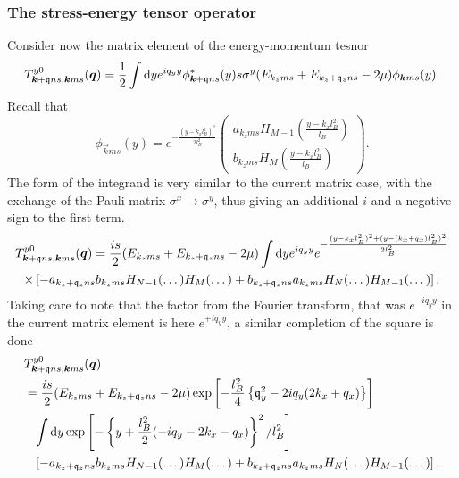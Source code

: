 \subsubsection{The stress-energy tensor operator}
Consider now the matrix element of the energy-momentum tesnor
\begin{equation}
\label{eq:75}
T^{y 0}_{\bm{k}+\mathfrak{q}ns, \bm{k}ms} (\bm{q})
=
\frac{1}{2}
\int \mathrm{d}y e^{iq_y y}
\phi ^* _{\bm{k}+\mathfrak{q} ns}(y) s \sigma ^y (E_{k_z m s} + E_{k_z+\mathfrak{q}_z n s}- 2\mu )
\phi _{\bm{k} ms}(y).
\end{equation}
Recall that 
\begin{equation}
  \phi _{\vec{k}ms}(y) =
  e^{- \frac{(y - k_x l_B ^2)^2}{2 l_B^2}}
  \begin{pmatrix}
    a_{k_z ms} H_{M-1} \left( \frac{y-k_x l_B^2}{l_B} \right)\\
    b_{k_z ms} H_M \left( \frac{y - k_x l_B^2}{l_B} \right)
  \end{pmatrix}.
\end{equation}
The form of the integrand is very similar to the current matrix case, with the exchange of the Pauli matrix $\sigma ^x \to \sigma ^y$, thus giving an additional $i$ and a negative sign to the first term.
\begin{multline}
T^{y 0}_{\bm{k}+\mathfrak{q}ns, \bm{k}ms} (\bm{q})
  = \frac{i s}{2}
    (E_{k_z m s} + E_{k_z+\mathfrak{q}_z n s}- 2\mu )
    \int \mathrm{d}y e^{iq_y y} e^{- \frac{(y-k_xl_B^2)^2 + (y-(k_x + q_x) l_B^2)^2}{2 l_B^2}}\\
    \times \left[
    - a_{k_z+\mathfrak{q}_z ns} b_{k_z ms} H_{N-1} (\dots ) H_M(\dots )
    + b_{k_z+\mathfrak{q}_z ns} a_{k_zms} H_N(\dots ) H_{M-1}(\dots )
    \right].
\end{multline}
Taking care to note that the factor from the Fourier transform, that was $e^{-iq_y y}$ in the current matrix element is here $e^{+ i q_y y}$, a similar completion of the square is done
\begin{equation}
  \begin{split}
    &T^{y 0}_{\bm{k}+\mathfrak{q}ns, \bm{k}ms} (\bm{q})\\
    &=
    \frac{i s}{2}
    (E_{k_z m s} + E_{k_z+\mathfrak{q}_z n s}- 2\mu )
    \exp \left[
      -\frac{l_B^2}{4} \left\{ \mathfrak{q}_y^2 - 2 i q_y (2 k_x + q_x) \right\}
    \right]\\
    &\phantom{=} \int \mathrm{d}y
    \exp \left[
      -\left\{ y + \frac{l_B^2}{2} (-iq_y - 2 k_x - q_x) \right\}^2 / l_B^2
    \right]\\
    &\phantom{=} \left[
      - a_{k_z+\mathfrak{q}_z ns} b_{k_z ms} H_{N-1} (\dots ) H_M(\dots )
      + b_{k_z+\mathfrak{q}_z ns} a_{k_zms} H_N(\dots ) H_{M-1}(\dots )
    \right].
  \end{split}
\end{equation}
